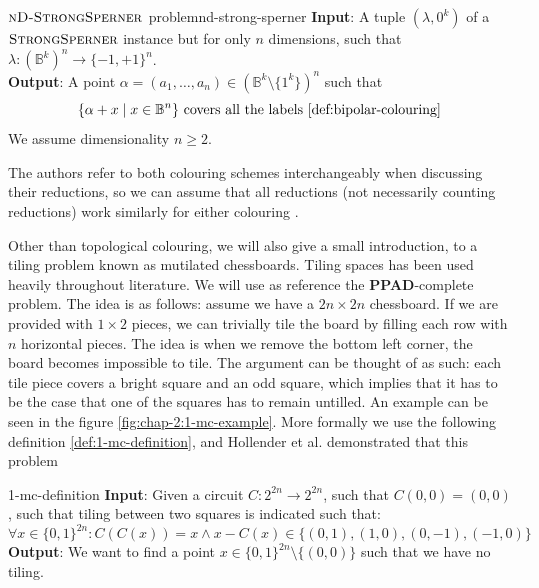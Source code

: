 \begin{definitionbox}{$\textnormal{\textsc{nD-StrongSperner}}$ problem}{nd-strong-sperner}
    \textbf{Input}: A tuple $(\lambda,0^k)$ of a $\textnormal{\textsc{StrongSperner}}$ instance but for only $n$ dimensions, such that
    $\lambda : (\mathbb{B}^k)^n \to \{-1, +1\}^n$.\\
    \textbf{Output}: A point $\alpha = (a_1, \hdots, a_n) \in (\mathbb{B}^k \setminus \{1^k\})^n$ such that
    $$
        \{\alpha + x \mid x \in \mathbb{B}^n\} \text{ covers all the labels \ref{def:bipolar-colouring}}
    $$
    We assume dimensionality $n \geq 2$.
\end{definitionbox}

The authors refer to both colouring schemes interchangeably when discussing their reductions,
so we can assume that all reductions (not necessarily counting reductions) work similarly for either colouring
\cite{chen_SettlingComplexityComputing_2009, deligkas_PureCircuitTightInapproximability_2024, daskalakis_ComplexityComputingNash_2006, chen_Complexity2DDiscrete_2009}.

Other than topological colouring, we will also give a small introduction, to a tiling problem known as mutilated chessboards. Tiling
spaces has been used heavily throughout literature. %
We will use as reference the \textbf{PPAD}-complete  problem. The idea is as follows:
assume we have a $2n \times 2n$ chessboard. If we are provided with $1 \times 2$ pieces, we can trivially tile the board by filling each row with $n$ horizontal
pieces. The idea is when we remove the bottom left corner, the board becomes impossible to tile. The argument
can be thought of as such: each tile piece covers a bright square and an odd square, which implies that it has to be the case that one of the squares
has to remain untilled. An example can be seen in the figure \ref{fig:chap-2:1-mc-example}. More formally we use the following definition \ref{def:1-mc-definition},
and Hollender et al. \cite{hollender_ComplexityMultisourceVariants_2018} demonstrated that this problem



\begin{definitionbox}{ \cite{hollender_ComplexityMultisourceVariants_2018}}{1-mc-definition}
    \label{def:1-mc-definition}
    \textbf{Input}: Given a circuit $C : 2^{2n} \to 2^{2n}$, such that $C(0,0) = (0,0)$, such that tiling between two
    squares is indicated such that:
    $$
        \forall x \in \{0,1\}^{2n} : C(C(x)) = x \wedge x - C(x) \in \{(0,1), (1,0), (0, -1), (-1, 0 )\}
    $$
    \textbf{Output}: We want to find a point $x \in \{0,1\}^{2n} \setminus \{(0,0)\}$ such that we have no tiling.
\end{definitionbox}

